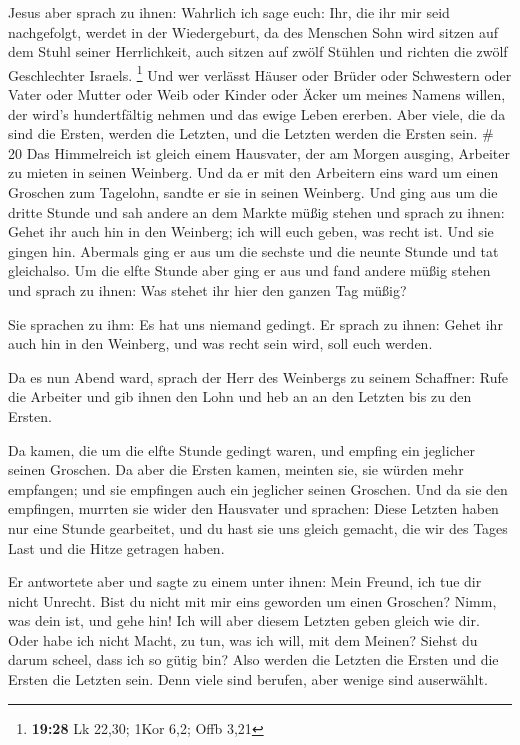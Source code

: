 Jesus aber sprach zu ihnen: Wahrlich ich sage euch: Ihr,
die ihr mir seid nachgefolgt, werdet in der Wiedergeburt, da des
Menschen Sohn wird sitzen auf dem Stuhl seiner Herrlichkeit, auch sitzen
auf zwölf Stühlen und richten die zwölf Geschlechter Israels.
\footnote{\textbf{19:28} Lk 22,30; 1Kor 6,2; Offb 3,21} 
Und wer verlässt Häuser oder Brüder oder Schwestern oder Vater oder
Mutter oder Weib oder Kinder oder Äcker um meines Namens willen, der
wird's hundertfältig nehmen und das ewige Leben ererben. 
Aber viele, die da sind die Ersten, werden die Letzten, und die Letzten
werden die Ersten sein. \# 20  Das Himmelreich ist gleich
einem Hausvater, der am Morgen ausging, Arbeiter zu mieten in seinen
Weinberg.  Und da er mit den Arbeitern eins ward um einen
Groschen zum Tagelohn, sandte er sie in seinen Weinberg. 
Und ging aus um die dritte Stunde und sah andere an dem Markte müßig
stehen  und sprach zu ihnen: Gehet ihr auch hin in den
Weinberg; ich will euch geben, was recht ist.  Und sie
gingen hin. Abermals ging er aus um die sechste und die neunte Stunde
und tat gleichalso.  Um die elfte Stunde aber ging er aus
und fand andere müßig stehen und sprach zu ihnen: Was stehet ihr hier
den ganzen Tag müßig?

 Sie sprachen zu ihm: Es hat uns niemand gedingt. Er
sprach zu ihnen: Gehet ihr auch hin in den Weinberg, und was recht sein
wird, soll euch werden.

 Da es nun Abend ward, sprach der Herr des Weinbergs zu
seinem Schaffner: Rufe die Arbeiter und gib ihnen den Lohn und heb an an
den Letzten bis zu den Ersten.

 Da kamen, die um die elfte Stunde gedingt waren, und
empfing ein jeglicher seinen Groschen.  Da aber die
Ersten kamen, meinten sie, sie würden mehr empfangen; und sie empfingen
auch ein jeglicher seinen Groschen.  Und da sie den
empfingen, murrten sie wider den Hausvater  und sprachen:
Diese Letzten haben nur eine Stunde gearbeitet, und du hast sie uns
gleich gemacht, die wir des Tages Last und die Hitze getragen haben.

 Er antwortete aber und sagte zu einem unter ihnen: Mein
Freund, ich tue dir nicht Unrecht. Bist du nicht mit mir eins geworden
um einen Groschen?  Nimm, was dein ist, und gehe hin! Ich
will aber diesem Letzten geben gleich wie dir.  Oder habe
ich nicht Macht, zu tun, was ich will, mit dem Meinen? Siehst du darum
scheel, dass ich so gütig bin?  Also werden die Letzten
die Ersten und die Ersten die Letzten sein. Denn viele sind berufen,
aber wenige sind auserwählt.

